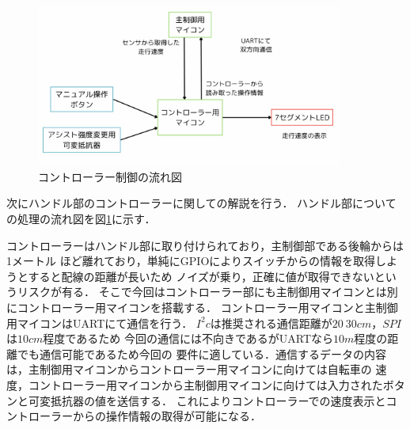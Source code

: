 \documentclass[uplatex,dvipdfmx]{jsarticle}
\begin{document}




\begin{figure}[H]
    \centering
    \includegraphics[width=0.9\textwidth]{fig/nagare_conto.png}
    \caption{コントローラー制御の流れ図}
    \label{fig:nagare_conto}
\end{figure}
次にハンドル部のコントローラーに関しての解説を行う．
ハンドル部についての処理の流れ図を図\ref{fig:nagare_conto}に示す．

コントローラーはハンドル部に取り付けられており，主制御部である後輪からは1メートル
ほど離れており，単純にGPIOによりスイッチからの情報を取得しようとすると配線の距離が長いため
ノイズが乗り，正確に値が取得できないというリスクが有る．
そこで今回はコントローラー部にも主制御用マイコンとは別にコントローラー用マイコンを搭載する．
コントローラー用マイコンと主制御用マイコンはUARTにて通信を行う．
$I^2c$は推奨される通信距離が$20~30cm$，$SPI$は$10cm$程度であるため
今回の通信には不向きであるがUARTなら$10m$程度の距離でも通信可能であるため今回の
要件に適している．通信するデータの内容は，主制御用マイコンからコントローラー用マイコンに向けては自転車の
速度，コントローラー用マイコンから主制御用マイコンに向けては入力されたボタンと可変抵抗器の値を送信する．
これによりコントローラーでの速度表示とコントローラーからの操作情報の取得が可能になる．
\end{document}
